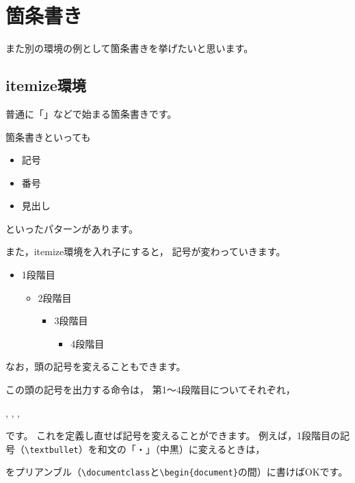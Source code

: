 \documentclass[class=jreport, crop=false, preview=false, dvipdfmx, fleqn]{standalone}
\begin{document}
\section{箇条書き}
また別の環境の例として箇条書きを挙げたいと思います。


\subsection{itemize環境}
普通に「\textbullet」などで始まる箇条書きです。

\begin{IOTeX}
箇条書きといっても
\begin{itemize}
\item 記号
\item 番号
\item 見出し
\end{itemize}
といったパターンがあります。
\end{IOTeX}


また，itemize環境を入れ子にすると，
記号が変わっていきます。

\begin{IOTeX}
\begin{itemize}
\item 1段階目
  \begin{itemize}
  \item 2段階目
    \begin{itemize}
    \item 3段階目
      \begin{itemize}
      \item 4段階目
      \end{itemize}
    \end{itemize}
  \end{itemize}
\end{itemize}
\end{IOTeX}

なお，頭の記号を変えることもできます。

この頭の記号を出力する命令は，
第1～4段階目についてそれぞれ，
\begin{ITeX}
, , , 
\end{ITeX}
です。
これを定義し直せば記号を変えることができます。
例えば，1段階目の記号{\textbullet}（\verb|\textbullet|）を和文の「・」（中黒）に変えるときは，
\begin{ITeX}
\renewcommand{\labelitemi}{・}
\end{ITeX}
をプリアンブル（\verb|\documentclass|と\verb|\begin{document}|の間）に書けばOKです。
\end{document}
